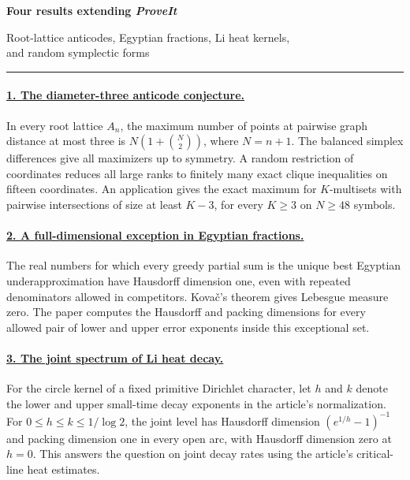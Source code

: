 \documentclass[11pt]{article}
\begin{document}
\par\vspace{1.5em}
{\LARGE\bfseries Four results extending \textit{ProveIt}}\par\vspace{.4em}
{\large Root-lattice anticodes, Egyptian fractions, Li heat kernels,\\and random symplectic forms}\par\medskip
\noindent\rule{\linewidth}{.5pt}

\paragraph{\hyperref[paperOne]{1. The diameter-three anticode conjecture.}}
In every root lattice $A_n$, the maximum number of points at pairwise graph distance at most three is $N(1+\binom N2)$, where $N=n+1$. The balanced simplex differences give all maximizers up to symmetry. A random restriction of coordinates reduces all large ranks to finitely many exact clique inequalities on fifteen coordinates. An application gives the exact maximum for $K$-multisets with pairwise intersections of size at least $K-3$, for every $K\ge3$ on $N\ge48$ symbols.

\paragraph{\hyperref[paperTwo]{2. A full-dimensional exception in Egyptian fractions.}}
The real numbers for which every greedy partial sum is the unique best Egyptian underapproximation have Hausdorff dimension one, even with repeated denominators allowed in competitors. Kova\v c's theorem gives Lebesgue measure zero. The paper computes the Hausdorff and packing dimensions for every allowed pair of lower and upper error exponents inside this exceptional set.

\paragraph{\hyperref[paperThree]{3. The joint spectrum of Li heat decay.}}
For the circle kernel of a fixed primitive Dirichlet character, let $h$ and $k$ denote the lower and upper small-time decay exponents in the article's normalization. For $0\le h\le k\le1/\log2$, the joint level has Hausdorff dimension $(e^{1/h}-1)^{-1}$ and packing dimension one in every open arc, with Hausdorff dimension zero at $h=0$. This answers the question on joint decay rates using the article's critical-line heat estimates.
\end{document}
